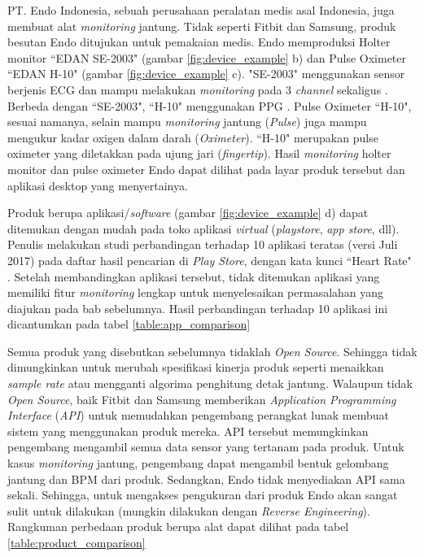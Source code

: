 PT. Endo Indonesia, sebuah perusahaan peralatan medis asal Indonesia, juga membuat alat \textit{monitoring} jantung. Tidak seperti Fitbit dan Samsung, produk besutan Endo ditujukan untuk pemakaian medis. Endo memproduksi Holter monitor ``EDAN SE-2003" (gambar \ref{fig:device_example} b) dan Pulse Oximeter ``EDAN H-10" (gambar \ref{fig:device_example} c). "SE-2003" menggunakan sensor berjenis ECG dan mampu melakukan \textit{monitoring} pada 3 \textit{channel} sekaligus \cite{endo_holter}. Berbeda dengan ``SE-2003", ``H-10" menggunakan PPG \cite{endo_oxi}. Pulse Oximeter ``H-10", sesuai namanya, selain mampu \textit{monitoring} jantung (\textit{Pulse}) juga mampu mengukur kadar oxigen dalam darah (\textit{Oximeter}). ``H-10" merupakan pulse oximeter yang diletakkan pada ujung jari (\textit{fingertip}). Hasil \textit{monitoring} holter monitor dan pulse oximeter Endo dapat dilihat pada layar produk tersebut dan aplikasi desktop yang menyertainya.

Produk berupa aplikasi/\textit{software} (gambar \ref{fig:device_example} d) dapat ditemukan dengan mudah pada toko aplikasi \textit{virtual} (\textit{playstore}, \textit{app store}, dll). Penulis melakukan studi perbandingan terhadap 10 aplikasi teratas (versi Juli 2017) pada daftar hasil pencarian di \textit{Play Store}, dengan kata kunci ``Heart Rate" \cite{playstore_heart}. Setelah membandingkan aplikasi tersebut, tidak ditemukan aplikasi yang memiliki fitur \textit{monitoring} lengkap untuk menyelesaikan permasalahan yang diajukan pada bab sebelumnya. Hasil perbandingan terhadap 10 aplikasi ini dicantumkan pada tabel \ref{table:app_comparison}

Semua produk yang disebutkan sebelumnya tidaklah \textit{Open Source}. Sehingga tidak dimungkinkan untuk merubah spesifikasi kinerja produk seperti menaikkan \textit{sample rate} atau mengganti algorima penghitung detak jantung. Walaupun tidak \textit{Open Source}, baik Fitbit dan Samsung memberikan \textit{Application Programming Interface} (\textit{API}) untuk memudahkan pengembang perangkat lunak membuat sistem yang menggunakan produk mereka. API tersebut memungkinkan pengembang mengambil semua data sensor yang tertanam pada produk. Untuk kasus \textit{monitoring} jantung, pengembang dapat mengambil bentuk gelombang jantung dan BPM dari produk. Sedangkan, Endo tidak menyediakan API sama sekali. Sehingga, untuk mengakses pengukuran dari produk Endo akan sangat sulit untuk dilakukan (mungkin dilakukan dengan \textit{Reverse Engineering}). Rangkuman perbedaan produk berupa alat dapat dilihat pada tabel \ref{table:product_comparison}

